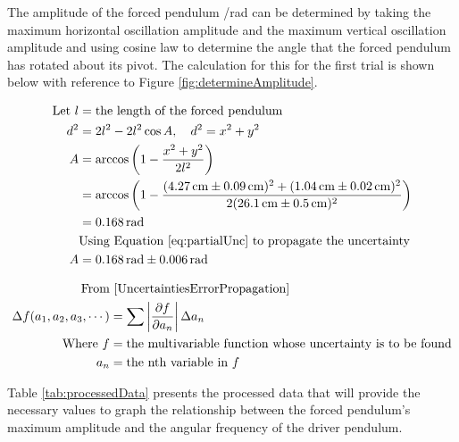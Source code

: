 \documentclass[letterpaper, 12pt]{article}
\begin{document}

The amplitude of the forced pendulum /\unit{rad} can be determined
by taking the maximum horizontal oscillation amplitude
and the maximum vertical oscillation amplitude
and using cosine law to determine the angle
that the forced pendulum has rotated about its
pivot. The calculation for this for the first
trial is shown below with reference to Figure \ref*{fig:determineAmplitude}.

\begingroup
\allowdisplaybreaks
\begin{align*}
    \text{Let } l & = \text{the length of the forced pendulum }
    \\
    d^2           & = 2l^2 - 2l^2\cos A,\quad d^2 = x^2 + y^2
    \\
    A             & = \arccos \left( 1 - \frac{x^2 + y^2}{2l^2} \right)
    \\
                  & = \arccos \left( 1 - \frac{( \SI{4.27}{cm} \pm \SI{0.09}{cm} )^2 + (\SI{1.04}{cm} \pm \SI{0.02}{cm})^2}{2(\SI{26.1}{cm} \pm \SI{0.5}{cm})^2 } \right)
    \\
                  & = \SI{0.168}{rad}
    \\
                  & \text{Using Equation \ref*{eq:partialUnc} to propagate the uncertainty}
    \\
    A             & = \SI{0.168}{rad} \pm \SI{0.006}{rad}
\end{align*}
\endgroup

\begin{align}
    \text{From}                     & \text{ \cite{UncertaintiesErrorPropagation}} \nonumber
    \\
    \Delta f(a_1, a_2, a_3, \cdots) & = \sum \left| \pdv{f}{a_n} \right| \Delta a_n \label{eq:partialUnc}
    \\
    \text{Where } f                 & = \text{the multivariable function whose uncertainty is to be found} \nonumber
    \\
    a_n                             & = \text{the nth variable in } f \nonumber
\end{align}

Table \ref*{tab:processedData} presents the processed data
that will provide the necessary values to graph the
relationship between the forced pendulum's maximum
amplitude and the angular frequency of the driver
pendulum.
\end{document}
